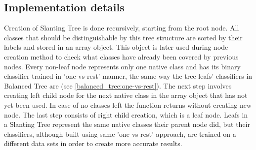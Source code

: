\subsection{Implementation details}

Creation of Slanting Tree is done recursively, starting from the root node. All classes that should be distinguishable by this tree structure are sorted by their labels and stored in an array object. This object is later used during node creation method to check what classes have already been covered by previous nodes. Every non-leaf node represents only one native class and has its binary classifier trained in 'one-vs-rest' manner, the same way the tree leafs' classifiers in Balanced Tree are (see \ref{balanced_tree:one-vs-rest}). The next step involves creating left child node for the next native class in the array object that has not yet been used. In case of no classes left the function returns without creating new node. The last step consists of right child creation, which is a leaf node. Leafs in a Slanting Tree represent the same native classes their parent node did, but their classifiers, although built using same 'one-vs-rest' approach, are trained on a different data sets in order to create more accurate results. %
